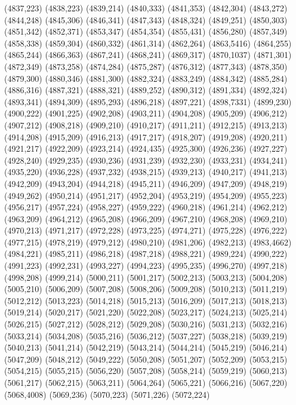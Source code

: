 (4837,223)
(4838,223)
(4839,214)
(4840,333)
(4841,353)
(4842,304)
(4843,272)
(4844,248)
(4845,306)
(4846,341)
(4847,343)
(4848,324)
(4849,251)
(4850,303)
(4851,342)
(4852,371)
(4853,347)
(4854,354)
(4855,431)
(4856,280)
(4857,349)
(4858,338)
(4859,304)
(4860,332)
(4861,314)
(4862,264)
(4863,5416)
(4864,255)
(4865,244)
(4866,363)
(4867,241)
(4868,241)
(4869,317)
(4870,1037)
(4871,301)
(4872,349)
(4873,258)
(4874,284)
(4875,287)
(4876,312)
(4877,343)
(4878,350)
(4879,300)
(4880,346)
(4881,300)
(4882,324)
(4883,249)
(4884,342)
(4885,284)
(4886,316)
(4887,321)
(4888,321)
(4889,252)
(4890,312)
(4891,334)
(4892,324)
(4893,341)
(4894,309)
(4895,293)
(4896,218)
(4897,221)
(4898,7331)
(4899,230)
(4900,222)
(4901,225)
(4902,208)
(4903,211)
(4904,208)
(4905,209)
(4906,212)
(4907,212)
(4908,218)
(4909,210)
(4910,217)
(4911,211)
(4912,215)
(4913,213)
(4914,208)
(4915,209)
(4916,213)
(4917,217)
(4918,207)
(4919,208)
(4920,211)
(4921,217)
(4922,209)
(4923,214)
(4924,435)
(4925,300)
(4926,236)
(4927,227)
(4928,240)
(4929,235)
(4930,236)
(4931,239)
(4932,230)
(4933,231)
(4934,241)
(4935,220)
(4936,228)
(4937,232)
(4938,215)
(4939,213)
(4940,217)
(4941,213)
(4942,209)
(4943,204)
(4944,218)
(4945,211)
(4946,209)
(4947,209)
(4948,219)
(4949,262)
(4950,214)
(4951,217)
(4952,204)
(4953,219)
(4954,209)
(4955,223)
(4956,217)
(4957,224)
(4958,227)
(4959,222)
(4960,218)
(4961,214)
(4962,212)
(4963,209)
(4964,212)
(4965,208)
(4966,209)
(4967,210)
(4968,208)
(4969,210)
(4970,213)
(4971,217)
(4972,228)
(4973,225)
(4974,271)
(4975,228)
(4976,222)
(4977,215)
(4978,219)
(4979,212)
(4980,210)
(4981,206)
(4982,213)
(4983,4662)
(4984,221)
(4985,211)
(4986,218)
(4987,218)
(4988,221)
(4989,224)
(4990,222)
(4991,223)
(4992,231)
(4993,227)
(4994,223)
(4995,235)
(4996,270)
(4997,218)
(4998,208)
(4999,214)
(5000,211)
(5001,217)
(5002,213)
(5003,213)
(5004,208)
(5005,210)
(5006,209)
(5007,208)
(5008,206)
(5009,208)
(5010,213)
(5011,219)
(5012,212)
(5013,223)
(5014,218)
(5015,213)
(5016,209)
(5017,213)
(5018,213)
(5019,214)
(5020,217)
(5021,220)
(5022,208)
(5023,217)
(5024,213)
(5025,214)
(5026,215)
(5027,212)
(5028,212)
(5029,208)
(5030,216)
(5031,213)
(5032,216)
(5033,214)
(5034,208)
(5035,216)
(5036,212)
(5037,227)
(5038,218)
(5039,219)
(5040,213)
(5041,214)
(5042,219)
(5043,214)
(5044,214)
(5045,219)
(5046,214)
(5047,209)
(5048,212)
(5049,222)
(5050,208)
(5051,207)
(5052,209)
(5053,215)
(5054,215)
(5055,215)
(5056,220)
(5057,208)
(5058,214)
(5059,219)
(5060,213)
(5061,217)
(5062,215)
(5063,211)
(5064,264)
(5065,221)
(5066,216)
(5067,220)
(5068,4008)
(5069,236)
(5070,223)
(5071,226)
(5072,224)
